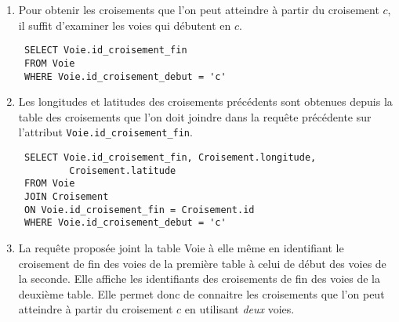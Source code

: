\begin{enumerate}
 \item Pour obtenir les croisements que l'on peut atteindre à partir du croisement $c$, il suffit d'examiner les voies qui débutent en $c$. 
\begin{verbatim}
 SELECT Voie.id_croisement_fin
 FROM Voie
 WHERE Voie.id_croisement_debut = 'c'
\end{verbatim}

\item Les longitudes et latitudes des croisements précédents sont obtenues depuis la table des croisements que l'on doit joindre dans la requête précédente sur l'attribut \texttt{Voie.id\_croisement\_fin}.

\begin{verbatim}
 SELECT Voie.id_croisement_fin, Croisement.longitude,
         Croisement.latitude 
 FROM Voie 
 JOIN Croisement 
 ON Voie.id_croisement_fin = Croisement.id
 WHERE Voie.id_croisement_debut = 'c'
\end{verbatim}

\item La requête proposée joint la table Voie à elle même en identifiant le croisement de fin des voies de la première table à celui de début des voies de la seconde. Elle affiche les identifiants des croisements de fin des voies de la deuxième table. Elle permet donc de connaitre les croisements que l'on peut atteindre à partir du croisement $c$ en utilisant \emph{deux} voies.
\end{enumerate}
